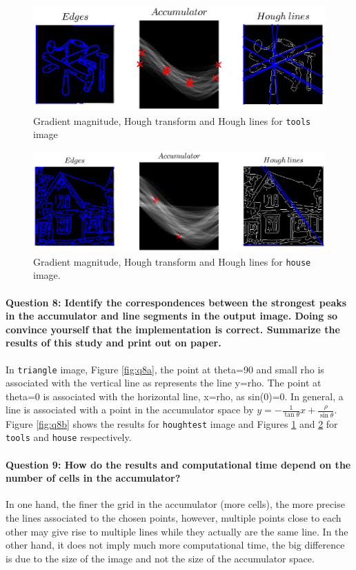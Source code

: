 \documentclass[12pt]{article}
\begin{document}
\begin{figure}[htbp]
 \centering
 \includegraphics[width=\textwidth]{q8c}
 \caption{Gradient magnitude, Hough transform and Hough lines for \texttt{tools} image}
 \label{fig:q8c}
\end{figure}

\begin{figure}[htbp]
 \centering
 \includegraphics[width=\textwidth]{q8d}
 \caption{Gradient magnitude, Hough transform and Hough lines for \texttt{house} image.}
 \label{fig:q8d}
\end{figure}

\paragraph{Question 8: Identify the correspondences between the strongest peaks in the accumulator and line segments in the output image. Doing so convince yourself that the implementation is correct. Summarize the results of this study and print out on paper.} In \texttt{triangle} image, Figure \ref{fig:q8a}, the point at theta=90 and small rho is associated with the vertical line as represents the line y=rho. The point at theta=0 is associated with the horizontal line, x=rho, as sin(0)=0. In general, a line is associated with a point in the accumulator space by \(y=-\frac{1}{\tan\theta}x+\frac{\rho}{\sin\theta}\). Figure \ref{fig:q8b} shows the results for \texttt{houghtest} image and Figures \ref{fig:q8c} and \ref{fig:q8d} for \texttt{tools} and \texttt{house} respectively.

\paragraph{Question 9: How do the results and computational time depend on the number of cells in the accumulator?}
In one hand, the finer the grid in the accumulator (more cells), the more precise the lines associated to the chosen points, however, multiple points close to each other may give rise to multiple lines while they actually are the same line. In the other hand, it does not imply much more computational time, the big difference is due to the size of the image and not the size of the accumulator space.
\end{document}
